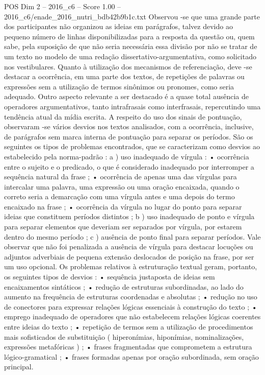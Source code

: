 \begin{textsample}{POS Dim 2 – 2016\_c6 – Score 1.00 – 2016\_c6/enade\_2016\_nutri\_bdb42b9b1c.txt}
Observou -se que uma grande parte dos participantes não organizou as ideias em parágrafos, talvez devido ao pequeno número de linhas disponibilizadas para a resposta da questão ou, quem sabe, pela suposição de que não seria necessária essa divisão por não se tratar de um texto no modelo de uma redação dissertativo-argumentativa, como solicitado nos vestibulares.
Quanto à utilização dos mecanismos de referenciação, deve -se destacar a ocorrência, em uma parte dos textos, de repetições de palavras ou expressões sem a utilização de termos sinônimos ou pronomes, como seria adequado.
Outro aspecto relevante a ser destacado é a quase total ausência de operadores argumentativos, tanto intrafrasais como interfrasais, repercutindo uma tendência atual da mídia escrita.
A respeito do uso dos sinais de pontuação, observaram -se vários desvios nos textos analisados, com a ocorrência, inclusive, de parágrafos sem marca interna de pontuação para separar os períodos.
São os seguintes os tipos de problemas encontrados, que se caracterizam como desvios ao estabelecido pela norma-padrão : a ) uso inadequado de vírgula : • ocorrência entre o sujeito e o predicado, o que é considerado inadequado por interromper a sequência natural da frase ; • ocorrência de apenas uma das vírgulas para intercalar uma palavra, uma expressão ou uma oração encaixada, quando o correto seria a demarcação com uma vírgula antes e uma depois do termo encaixado na frase ; • ocorrência da vírgula no lugar do ponto para separar ideias que constituem períodos distintos ; b ) uso inadequado de ponto e vírgula para separar elementos que deveriam ser separados por vírgula, por estarem dentro do mesmo período ; c ) ausência de ponto final para separar períodos.
Vale observar que não foi penalizada a ausência de vírgula para destacar locuções ou adjuntos adverbiais de pequena extensão deslocados de posição na frase, por ser um uso opcional.
Os problemas relativos à estruturação textual geram, portanto, os seguintes tipos de desvios : • sequência justaposta de ideias sem encaixamentos sintáticos ; • redução de estruturas subordinadas, ao lado do aumento na frequência de estruturas coordenadas e absolutas ; • redução no uso de conectores para expressar relações lógicas essenciais à construção do texto ; • emprego inadequado de operadores que não estabelecem relações lógicas coerentes entre ideias do texto ; • repetição de termos sem a utilização de procedimentos mais sofisticados de substituição ( hiperonímias, hiponímias, nominalizações, expressões metafóricas ) ; • frases fragmentadas que comprometem a estrutura lógico-gramatical ; • frases formadas apenas por oração subordinada, sem oração principal.

\end{textsample}
